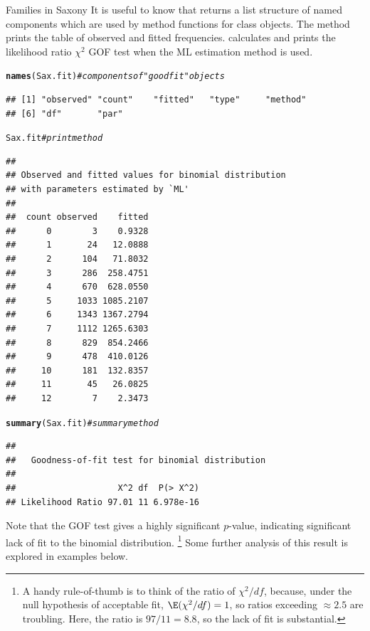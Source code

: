 \documentclass[11pt]{book}\usepackage[]{graphicx}\usepackage[]{color}
\makeatletter
\newcommand{\hlcom}[1]{\textcolor[rgb]{0.678,0.584,0.686}{\textit{#1}}}%
\newcommand{\hlstd}[1]{\textcolor[rgb]{0.345,0.345,0.345}{#1}}%
\newcommand{\hlkwd}[1]{\textcolor[rgb]{0.737,0.353,0.396}{\textbf{#1}}}%
\newenvironment{kframe}{%
 \def\at@end@of@kframe{}%
 \ifinner\ifhmode%
  \def\at@end@of@kframe{\end{minipage}}%
  \begin{minipage}{\columnwidth}%
 \fi\fi%
 \def\FrameCommand##1{\hskip\@totalleftmargin \hskip-\fboxsep
 \colorbox{shadecolor}{##1}\hskip-\fboxsep
     \hskip-\linewidth \hskip-\@totalleftmargin \hskip\columnwidth}%
 \MakeFramed {\advance\hsize-\width
   \@totalleftmargin\z@ \linewidth\hsize
   \@setminipage}}%
 {\par\unskip\endMakeFramed%
 \at@end@of@kframe}
\newenvironment{knitrout}{}{} %
\renewenvironment{knitrout}{\small\renewcommand{\baselinestretch}{.85}}{} %
\makeatother
\begin{document}
\begin{Example}[saxfit]{Families in Saxony}
It is useful to know that  returns a list structure of
named components which are used by method functions for class 
objects. The  method prints the table of
observed and fitted frequencies.  calculates and
prints the likelihood ratio $\chi^2$ GOF test when the ML estimation method is used.
\begin{knitrout}
\color{fgcolor}\begin{kframe}
\begin{alltt}
\hlkwd{names}\hlstd{(Sax.fit)}     \hlcom{# components of "goodfit" objects}
\end{alltt}
\begin{verbatim}
## [1] "observed" "count"    "fitted"   "type"     "method"  
## [6] "df"       "par"
\end{verbatim}
\begin{alltt}
\hlstd{Sax.fit}            \hlcom{# print method}
\end{alltt}
\begin{verbatim}
## 
## Observed and fitted values for binomial distribution
## with parameters estimated by `ML' 
## 
##  count observed    fitted
##      0        3    0.9328
##      1       24   12.0888
##      2      104   71.8032
##      3      286  258.4751
##      4      670  628.0550
##      5     1033 1085.2107
##      6     1343 1367.2794
##      7     1112 1265.6303
##      8      829  854.2466
##      9      478  410.0126
##     10      181  132.8357
##     11       45   26.0825
##     12        7    2.3473
\end{verbatim}
\begin{alltt}
\hlkwd{summary}\hlstd{(Sax.fit)}   \hlcom{# summary method}
\end{alltt}
\begin{verbatim}
## 
## 	 Goodness-of-fit test for binomial distribution
## 
##                    X^2 df  P(> X^2)
## Likelihood Ratio 97.01 11 6.978e-16
\end{verbatim}
\end{kframe}
\end{knitrout}

Note that the GOF test gives a highly significant $p$-value, indicating 
significant lack of fit to the binomial distribution.%
\footnote{
A handy rule-of-thumb is to think of the ratio of $\chi^2 / df$,
because, under the null hypothesis of acceptable fit, $\E (\chi^2 / df) = 1$,
so ratios exceeding $\approx 2.5$ are troubling.
Here, the ratio is $97 / 11 = 8.8$, so the lack of fit is substantial.
}
Some further analysis of this result is explored in examples below.
\end{Example}
\end{document}
